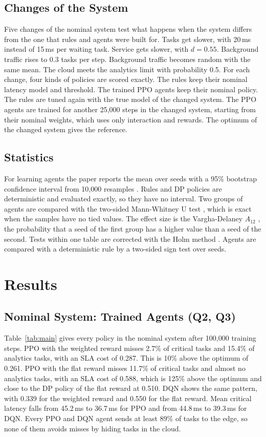 \documentclass[journal]{IEEEtran}
\begin{document}
\subsection{Changes of the System}
Five changes of the nominal system test what happens when the system differs from the one that rules and agents were built for. Tasks get slower, with 20\,ms instead of 15\,ms per waiting task. Service gets slower, with $d = 0.55$. Background traffic rises to 0.3 tasks per step. Background traffic becomes random with the same mean. The cloud meets the analytics limit with probability 0.5. For each change, four kinds of policies are scored exactly. The rules keep their nominal latency model and threshold. The trained PPO agents keep their nominal policy. The rules are tuned again with the true model of the changed system. The PPO agents are trained for another 25,000 steps in the changed system, starting from their nominal weights, which uses only interaction and rewards. The optimum of the changed system gives the reference.

\subsection{Statistics}
For learning agents the paper reports the mean over seeds with a 95\% bootstrap confidence interval from 10,000 resamples \cite{efron1993}. Rules and DP policies are deterministic and evaluated exactly, so they have no interval. Two groups of agents are compared with the two-sided Mann-Whitney U test \cite{mann1947}, which is exact when the samples have no tied values. The effect size is the Vargha-Delaney $A_{12}$ \cite{vargha2000}, the probability that a seed of the first group has a higher value than a seed of the second. Tests within one table are corrected with the Holm method \cite{holm1979}. Agents are compared with a deterministic rule by a two-sided sign test over seeds.

\section{Results}
\label{sec:results}

\subsection{Nominal System: Trained Agents (Q2, Q3)}
Table~\ref{tab:main} gives every policy in the nominal system after 100,000 training steps. PPO with the weighted reward misses 2.7\% of critical tasks and 15.4\% of analytics tasks, with an SLA cost of 0.287. This is 10\% above the optimum of 0.261. PPO with the flat reward misses 11.7\% of critical tasks and almost no analytics tasks, with an SLA cost of 0.588, which is 125\% above the optimum and close to the DP policy of the flat reward at 0.510. DQN shows the same pattern, with 0.339 for the weighted reward and 0.550 for the flat reward. Mean critical latency falls from 45.2\,ms to 36.7\,ms for PPO and from 44.8\,ms to 39.3\,ms for DQN. Every PPO and DQN agent sends at least 89\% of tasks to the edge, so none of them avoids misses by hiding tasks in the cloud.
\end{document}
